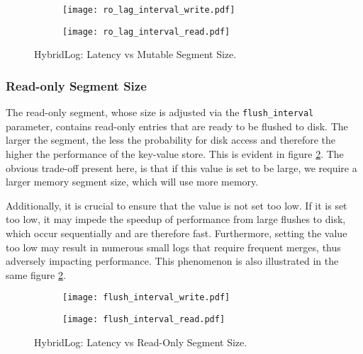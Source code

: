 \begin{figure}[h]
    \begin{subfigure}{.5\textwidth}
        \centering
        \texttt{[image: ro\_lag\_interval\_write.pdf]}
    \end{subfigure}
    \begin{subfigure}{.5\textwidth}
        \centering
        \texttt{[image: ro\_lag\_interval\_read.pdf]}
    \end{subfigure}
    \caption{HybridLog: Latency vs Mutable Segment Size.}
    \label{fig:ro_lag_interval}
\end{figure}

\subsubsection{Read-only Segment Size}

The read-only segment, whose size is adjusted via the \verb"flush_interval" parameter, contains read-only entries that are ready to be flushed to disk. The larger the segment, the less the probability for disk access and therefore the higher the performance of the key-value store. This is evident in figure \ref{fig:flush_interval_write_read}. The obvious trade-off present here, is that if this value is set to be large, we require a larger memory segment size, which will use more memory.


Additionally, it is crucial to ensure that the value is not set too low. If it is set too low, it may impede the speedup of performance from large flushes to disk, which occur sequentially and are therefore fast. Furthermore, setting the value too low may result in numerous small logs that require frequent merges, thus adversely impacting performance. This phenomenon is also illustrated in the same figure \ref{fig:flush_interval_write_read}.

\begin{figure}[h]
    \begin{subfigure}{.5\textwidth}
        \centering
        \texttt{[image: flush\_interval\_write.pdf]}
    \end{subfigure}
    \begin{subfigure}{.5\textwidth}
        \centering
        \texttt{[image: flush\_interval\_read.pdf]}
    \end{subfigure}
    \caption{HybridLog: Latency vs Read-Only Segment Size.}
    \label{fig:flush_interval_write_read}
\end{figure}

